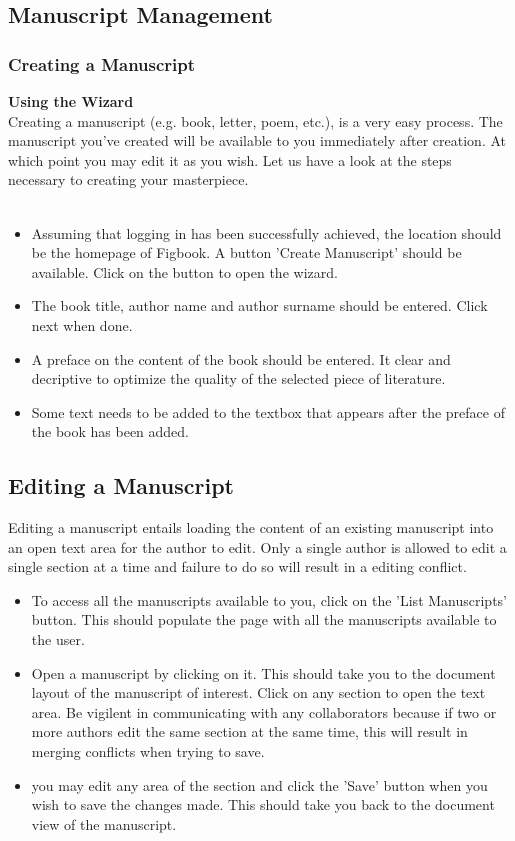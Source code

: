 \subsection{Manuscript Management}
\subsubsection{Creating a Manuscript}
\textbf{Using the Wizard}\\
	Creating a manuscript (e.g. book, letter, poem, etc.), is a very easy process. The manuscript you've created will be available to you immediately after creation. At which point you may edit it as you wish. Let us have a look at the steps necessary to creating your masterpiece.\\ \\

	\begin{itemize}
		\item Assuming that logging in has been successfully achieved, the location should be the homepage of Figbook. A button 'Create Manuscript' should be available. Click on the button to open the wizard.
		\item The book title, author name and author surname should be entered. Click next when done. 
		\item A preface on the content of the book should be entered. It clear and decriptive to optimize the quality of the selected piece of literature.
		\item Some text needs to be added to the textbox that appears after the preface of the book has been added.
	\end{itemize}

\subsection{Editing a Manuscript}
	Editing a manuscript entails loading the content of an existing manuscript into an open text area for the author to edit. Only a single author is allowed to edit a single section at a time and failure to do so will result in a editing conflict. 

	\begin{itemize}
		\item To access all the manuscripts available to you, click on the 'List Manuscripts' button. This should populate the page with all the manuscripts available to the user. 
		\item Open a manuscript by clicking on it. This should take you to the document layout of the manuscript of interest. Click on any section to open the text area. Be vigilent in communicating with any collaborators because if two or more authors edit the same section at the same time, this will result in merging conflicts when trying to save.
		\item you may edit any area of the section and click the 'Save' button when you wish to save the changes made. This should take you back to the document view of the manuscript.
	\end{itemize}